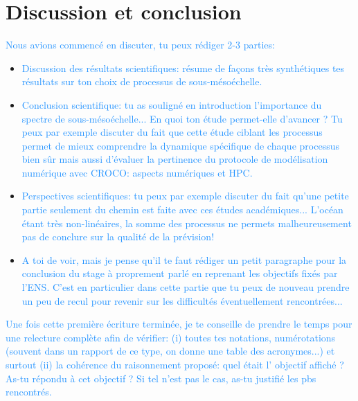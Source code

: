 \documentclass{rapportECC}
\newcommand{\FAadd}[1]{\textcolor{DodgerBlue}{{#1}}}                     %
\begin{document}
\section{Discussion et conclusion}

\FAadd{Nous avions commencé en discuter, tu peux rédiger 2-3 parties:}
\begin{itemize}
    \item \FAadd{Discussion des résultats scientifiques: résume de façons très synthétiques tes résultats sur ton choix de processus de sous-mésoéchelle.}
    \item \FAadd{Conclusion scientifique: tu as souligné en introduction l'importance du spectre de sous-mésoéchelle... En quoi ton étude permet-elle d'avancer ? Tu peux par exemple discuter du fait que cette étude ciblant les processus permet de mieux comprendre la dynamique spécifique de chaque processus bien sûr mais aussi d'évaluer la pertinence du protocole de modélisation numérique avec CROCO: aspects numériques et HPC.}
    \item \FAadd{Perspectives scientifiques: tu peux par exemple discuter du fait qu'une petite partie seulement du chemin est faite avec ces études académiques... L'océan étant très non-linéaires, la somme des processus ne permets malheureusement pas de conclure sur la qualité de la prévision!}
    \item \FAadd{A toi de voir, mais je pense qu'il te faut rédiger un petit paragraphe pour la conclusion du stage à proprement parlé en reprenant les objectifs fixés par l'ENS. C'est en particulier dans cette partie que tu peux de nouveau prendre un peu de recul pour revenir sur les difficultés éventuellement rencontrées...}
\end{itemize}

\FAadd{Une fois cette première écriture terminée, je te conseille de prendre le temps pour une relecture complète afin de vérifier: (i) toutes tes notations, numérotations (souvent dans un rapport de ce type, on donne une table des acronymes...) et surtout (ii) la cohérence du raisonnement proposé: quel était l' objectif affiché ? As-tu répondu à cet objectif ? Si tel n'est pas le cas, as-tu justifié les pbs rencontrés.}
\newpage


\printbibliography
\end{document}
